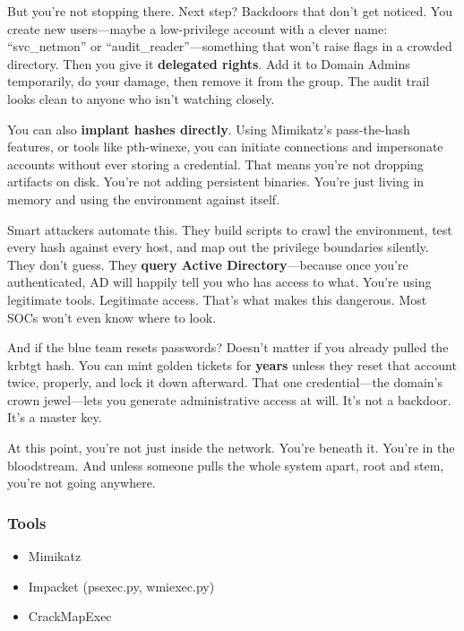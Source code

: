 But you're not stopping there. Next step? Backdoors that don’t get noticed. You create new users—maybe a low-privilege account with a clever name: “svc\_netmon” or “audit\_reader”—something that won’t raise flags in a crowded directory. Then you give it \textbf{delegated rights}. Add it to Domain Admins temporarily, do your damage, then remove it from the group. The audit trail looks clean to anyone who isn’t watching closely.

You can also \textbf{implant hashes directly}. Using Mimikatz's pass-the-hash features, or tools like pth-winexe, you can initiate connections and impersonate accounts without ever storing a credential. That means you’re not dropping artifacts on disk. You’re not adding persistent binaries. You’re just living in memory and using the environment against itself.

Smart attackers automate this. They build scripts to crawl the environment, test every hash against every host, and map out the privilege boundaries silently. They don't guess. They \textbf{query Active Directory}—because once you’re authenticated, AD will happily tell you who has access to what. You’re using legitimate tools. Legitimate access. That’s what makes this dangerous. Most SOCs won’t even know where to look.

And if the blue team resets passwords? Doesn’t matter if you already pulled the krbtgt hash. You can mint golden tickets for \textbf{years} unless they reset that account twice, properly, and lock it down afterward. That one credential—the domain's crown jewel—lets you generate administrative access at will. It’s not a backdoor. It’s a master key.

At this point, you’re not just inside the network. You’re beneath it. You’re in the bloodstream. And unless someone pulls the whole system apart, root and stem, you're not going anywhere.

\subsubsection{\textbf{   Tools}}

\begin{itemize}
    \item Mimikatz

    \item Impacket (psexec.py, wmiexec.py)

    \item CrackMapExec

\end{itemize}

